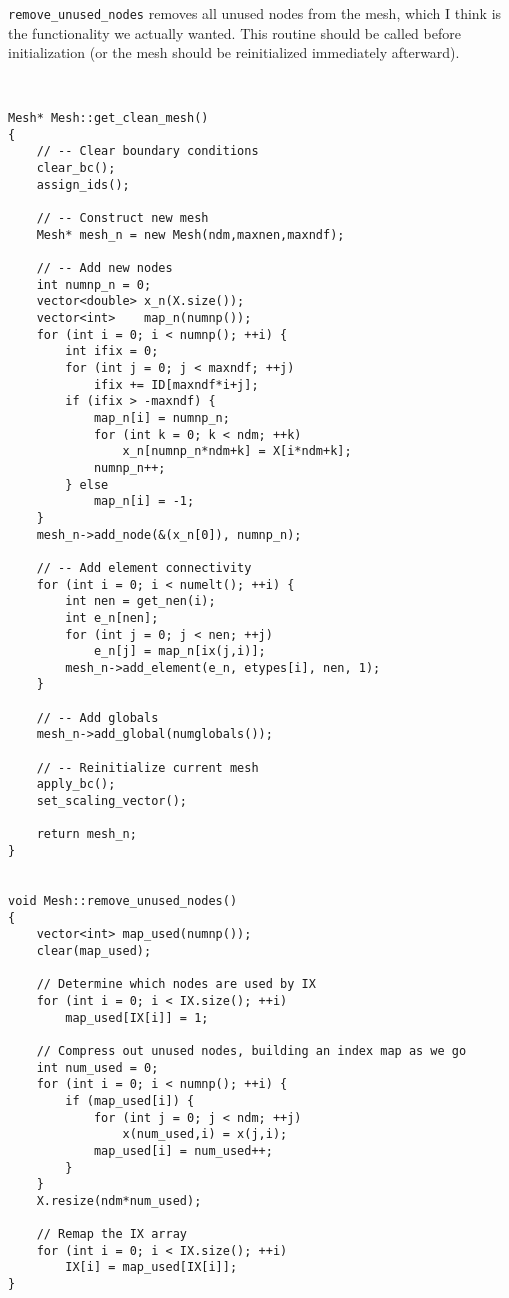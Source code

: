 {\tt remove\_unused\_nodes} removes all unused nodes from the mesh,
which I think is the functionality we actually wanted.  This routine
should be called before initialization (or the mesh should be
reinitialized immediately afterward).

\begin{verbatim}


Mesh* Mesh::get_clean_mesh()
{
    // -- Clear boundary conditions
    clear_bc();
    assign_ids();

    // -- Construct new mesh
    Mesh* mesh_n = new Mesh(ndm,maxnen,maxndf);

    // -- Add new nodes
    int numnp_n = 0;
    vector<double> x_n(X.size());
    vector<int>    map_n(numnp());
    for (int i = 0; i < numnp(); ++i) {
        int ifix = 0;
        for (int j = 0; j < maxndf; ++j)
            ifix += ID[maxndf*i+j];
        if (ifix > -maxndf) {
            map_n[i] = numnp_n;
            for (int k = 0; k < ndm; ++k)
                x_n[numnp_n*ndm+k] = X[i*ndm+k];
            numnp_n++;
        } else
            map_n[i] = -1;
    }
    mesh_n->add_node(&(x_n[0]), numnp_n);

    // -- Add element connectivity
    for (int i = 0; i < numelt(); ++i) {
        int nen = get_nen(i);
        int e_n[nen];
        for (int j = 0; j < nen; ++j)
            e_n[j] = map_n[ix(j,i)];
        mesh_n->add_element(e_n, etypes[i], nen, 1);
    }

    // -- Add globals
    mesh_n->add_global(numglobals());

    // -- Reinitialize current mesh
    apply_bc();
    set_scaling_vector();

    return mesh_n;
}


void Mesh::remove_unused_nodes()
{
    vector<int> map_used(numnp());
    clear(map_used);

    // Determine which nodes are used by IX
    for (int i = 0; i < IX.size(); ++i)
        map_used[IX[i]] = 1;

    // Compress out unused nodes, building an index map as we go
    int num_used = 0;
    for (int i = 0; i < numnp(); ++i) {
        if (map_used[i]) {
            for (int j = 0; j < ndm; ++j)
                x(num_used,i) = x(j,i);
            map_used[i] = num_used++;
        }
    }
    X.resize(ndm*num_used);

    // Remap the IX array
    for (int i = 0; i < IX.size(); ++i)
        IX[i] = map_used[IX[i]];
}


\end{verbatim}

